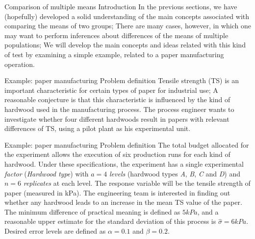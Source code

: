 \documentclass[t]{beamer}
\begin{document}


\begin{ftst}
{Comparison of multiple means}
{Introduction}
In the previous sections, we have (hopefully) developed a solid understanding of the main concepts associated with comparing the means of two groups;
\vone
There are many cases, however, in which one may want to perform inferences about differences of the means of multiple populations;
\vone
We will develop the main concepts and ideas related with this kind of test by examining a simple example, related to a paper manufacturing operation.
\end{ftst}


\begin{ftst}
{Example: paper manufacturing}
{Problem definition}
Tensile strength (TS) is an important characteristic for certain types of paper for industrial use;
\vone
A reasonable conjecture is that this characteristic is influenced by the kind of hardwood used in the manufacturing process.
\vone
The process engineer wants to investigate whether four different hardwoods result in papers with relevant differences of TS, using a pilot plant as his experimental unit.
\end{ftst}


\begin{ftst}
{Example: paper manufacturing}
{Problem definition}
The total budget allocated for the experiment allows the execution of six production runs for each kind of hardwood.
\vone
Under these specifications, the experiment has a single experimental \textit{factor} (\textit{Hardwood type}) with $a = 4$ \textit{levels} (hardwood types \textit{A}, \textit{B}, \textit{C} and \textit{D}) and $n = 6$ \textit{replicates} at each level.
\vone
The response variable will be the tensile strength of paper (measured in kPa). The engineering team is interested in finding out whether any hardwood leads to an increase in the mean TS value of the paper. 
\vone
The minimum difference of practical meaning is defined as $5 kPa$, and a reasonable upper estimate for the standard deviation of this process is $\hat{\sigma} = 6 kPa$. Desired error levels are defined as $\alpha = 0.1$ and $\beta = 0.2$.
\end{ftst}
\end{document}
